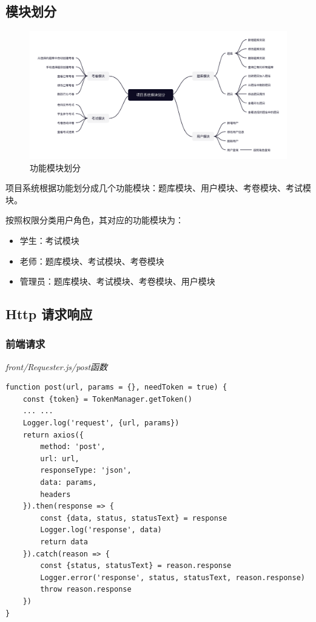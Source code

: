 \subsection{模块划分}
\begin{figure}[htb]
    \centering
    \includegraphics[width=\linewidth]{_images/功能模块划分.png}
    \caption{功能模块划分}
\end{figure}
项目系统根据功能划分成几个功能模块：题库模块、用户模块、考卷模块、考试模块。

按照权限分类用户角色，其对应的功能模块为：
\begin{itemize}
    \item 学生：考试模块
    \item 老师：题库模块、考试模块、考卷模块
    \item 管理员：题库模块、考试模块、考卷模块、用户模块
\end{itemize}

\subsection{Http 请求响应}
\subsubsection{前端请求}
\textit{front/Requester.js/post函数}
\begin{lstlisting}
function post(url, params = {}, needToken = true) {
    const {token} = TokenManager.getToken()
    ... ...
    Logger.log('request', {url, params})
    return axios({
        method: 'post',
        url: url,
        responseType: 'json',
        data: params,
        headers
    }).then(response => {
        const {data, status, statusText} = response
        Logger.log('response', data)
        return data
    }).catch(reason => {
        const {status, statusText} = reason.response
        Logger.error('response', status, statusText, reason.response)
        throw reason.response
    })
}
\end{lstlisting}